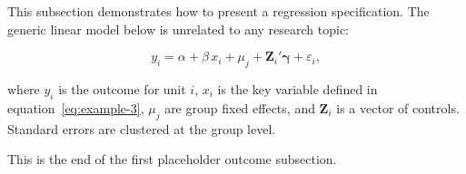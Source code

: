 
This subsection demonstrates how to present a regression specification. The
generic linear model below is unrelated to any research topic:

\begin{equation}
y_i = \alpha + \beta \, x_i + \mu_j + \mathbf{Z}_i'
\boldsymbol{\gamma} + \varepsilon_i ,
\label{eq:regression-1}
\end{equation}

where $y_i$ is the outcome for unit $i$, $x_i$ is the key variable defined
in equation~\eqref{eq:example-3}, $\mu_j$ are group fixed effects, and
$\mathbf{Z}_i$ is a vector of controls. Standard errors are clustered at the
group level.

This is the end of the first placeholder outcome subsection.
